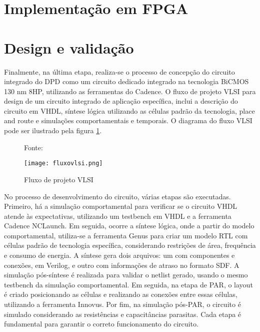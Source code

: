 \section{Implementação em FPGA}


\section{Design e validação}
Finalmente, na última etapa, realiza-se o processo de concepção do circuito integrado do DPD como um circuito dedicado integrado na tecnologia BiCMOS 130 nm 8HP, utilizando as ferramentas do Cadence.
O fluxo de projeto VLSI  para design de um circuito integrado de aplicação específica, inclui a descrição do circuito em VHDL, síntese lógica utilizando as células padrão da tecnologia, place and route e simulações comportamentais e temporais. O diagrama do fluxo VLSI pode ser ilustrado pela figura \ref{fig:CMOS2010}.

\begin{figure}[ht!]
    \centering
    \captionsetup{justification=centering}
    \caption*{Fonte: \cite{CMOS2010}}
    \texttt{[image: fluxovlsi.png]}
    \caption{Fluxo de projeto VLSI}
    \label{fig:CMOS2010}
\end{figure}

No processo de desenvolvimento do circuito, várias etapas são executadas. Primeiro, há a simulação comportamental para verificar se o circuito VHDL atende às expectativas, utilizando um testbench em VHDL e a ferramenta Cadence NCLaunch. Em seguida, ocorre a síntese lógica, onde a partir do modelo comportamental, utiliza-se a ferramenta Genus para criar um modelo RTL com células padrão de tecnologia específica, considerando restrições de área, frequência e consumo de energia. A síntese gera dois arquivos: um com componentes e conexões, em Verilog, e outro com informações de atraso no formato SDF. A simulação pós-síntese é realizada para validar o netlist gerado, usando o mesmo testbench da simulação comportamental. Em seguida, na etapa de PAR, o layout é criado posicionando as células e realizando as conexões entre essas células, utilizando a ferramenta Innovus. Por fim, na simulação pós-PAR, o circuito é simulado considerando as resistências e capacitâncias parasitas. Cada etapa é fundamental para garantir o correto funcionamento do circuito.